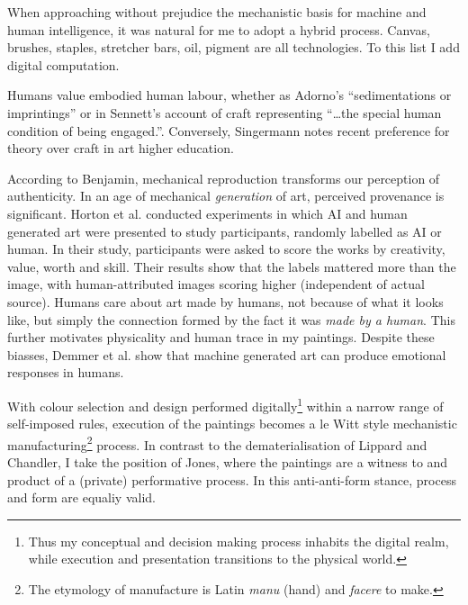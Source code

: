 \documentclass[12pt]{article}
\begin{document}
When approaching without prejudice the mechanistic basis for machine
and human intelligence, it was natural for me to adopt a hybrid
process.  Canvas, brushes, staples, stretcher bars, oil, pigment are
all technologies. To this list I add digital computation.

Humans value embodied human labour, whether as Adorno's
``sedimentations or imprintings''\cite[p. 5]{adorno1970aesthetic} or
in Sennett's account of craft representing ``\dots the special human
condition of being engaged.''\cite[p. 20]{sennett2008craftsman}.
Conversely, Singermann notes recent preference for theory over craft
in art higher education.\cite[p. 23-27]{singerman1999artist}

According to Benjamin, mechanical reproduction transforms our
perception of authenticity.\cite{benjamin1969art} In an age of
mechanical \emph{generation} of art, perceived provenance is
significant. Horton et al. conducted experiments in which AI and human
generated art were presented to study participants, randomly labelled
as AI or human.\cite{horton2023bias} In their study, participants were
asked to score the works by creativity, value, worth and skill. Their
results show that the labels mattered more than the image, with
human-attributed images scoring higher (independent of actual source).
Humans care about art made by humans, not because of what it looks
like, but simply the connection formed by the fact it was \emph{made
  by a human}. This further motivates physicality and human trace in
my paintings. Despite these biasses, Demmer et al. show that machine
generated art can produce emotional responses in
humans.\cite{demmer2023does}

With colour selection and design performed digitally\footnote{Thus my
  conceptual and decision making process inhabits the digital realm,
  while execution and presentation transitions to the physical world.}
within a narrow range of self-imposed rules, execution of the
paintings becomes a le Witt style\cite[Sentence
\#28]{LeWitt1969Sentences} mechanistic manufacturing\footnote{The
  etymology of manufacture is Latin \emph{manu} (hand) and
  \emph{facere} to make.} process. In contrast to the
dematerialisation of Lippard and
Chandler\cite{LippardChandler1968Dematerialization,lippard1973sixyears},
I take the position of Jones\cite[pp. 12-13]{Jones1998BodyArt}, where
the paintings are a witness to and product of a (private) performative
process. In this anti-anti-form\cite{Morris1968AntiForm} stance,
process and form are equaliy valid.
\end{document}
